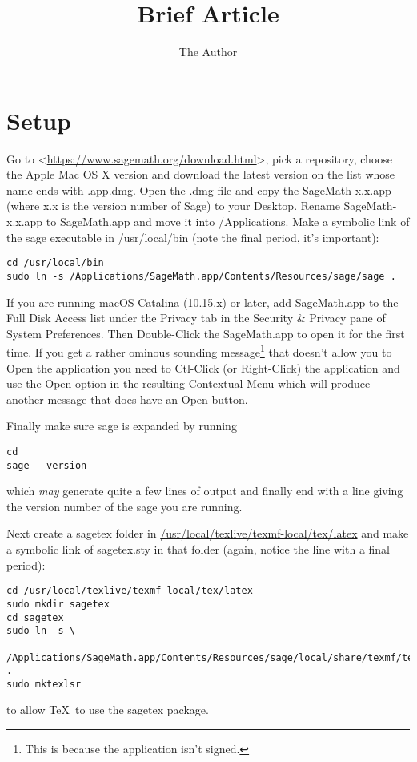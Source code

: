 \documentclass[11pt, oneside]{amsart}
\title{Brief Article}
\author{The Author}
\begin{document}
\maketitle

\section{Setup}

Go to <\url{https://www.sagemath.org/download.html}>, pick a repository, choose the \textsf{Apple Mac OS X} version and download the latest version on the list whose name ends with \textsf{.app.dmg}. Open the \textsf{.dmg} file and copy the \textsf{SageMath-x.x.app} (where \textsf{x.x} is the version number of \textsf{Sage}) to your Desktop. Rename \textsf{SageMath-x.x.app} to \textsf{SageMath.app} and move it into \textsf{/Applications}. Make a symbolic link of the \textsf{sage} executable in \textsf{/usr/local/bin} (note the final period, it's important):
{\footnotesize\begin{verbatim}
cd /usr/local/bin
sudo ln -s /Applications/SageMath.app/Contents/Resources/sage/sage .
\end{verbatim}
}


If you are running \textsf{macOS Catalina (10.15.x)} or later, add \textsf{SageMath.app} to the \textsf{Full Disk Access} list under the \textsf{Privacy} tab in the \textsf{Security \& Privacy} pane of \textsf{System Preferences}. Then \textsf{Double-Click} the \textsf{SageMath.app} to open it for the first time. If you get a rather ominous sounding message\footnote{This is because the application isn't signed.} that doesn't allow you to \textsf{Open} the application you need to \textsf{Ctl-Click} (or \textsf{Right-Click}) the application and use the \textsf{Open} option in the resulting \textsf{Contextual Menu} which will produce another message that does have an \textsf{Open} button.

Finally make sure sage is expanded by running
{\footnotesize\begin{verbatim}
cd
sage --version
\end{verbatim}
}
which \emph{may} generate quite a few lines of output and finally end with a line giving the version number of the \textsf{sage} you are running.

Next create a \textsf{sagetex} folder in \url{/usr/local/texlive/texmf-local/tex/latex} and make a symbolic link of \textsf{sagetex.sty} in that folder (again, notice the line with a final period):
{\footnotesize\begin{verbatim}
cd /usr/local/texlive/texmf-local/tex/latex
sudo mkdir sagetex
cd sagetex
sudo ln -s \
   /Applications/SageMath.app/Contents/Resources/sage/local/share/texmf/tex/latex/sagetex/sagetex.sty .
sudo mktexlsr
\end{verbatim}
}
to allow \TeX\ to use the \textsf{sagetex} package.
\end{document}
